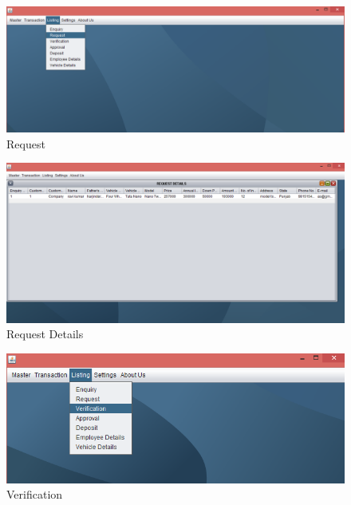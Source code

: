 \begin{figure}[ht]
\begin{center}
\includegraphics[scale=0.5]{images/image34.png}
\end{center}
\caption{Request}
\label{Request }
\end{figure}


\begin{figure}[ht]
\begin{center}
\includegraphics[scale=0.5]{images/image35.png}
\end{center}
\caption{Request Details}
\label{Request Details}
\end{figure}


\begin{figure}[ht]
\begin{center}
\includegraphics[scale=0.5]{images/image36.png}
\end{center}
\caption{Verification}
\label{Verification}
\end{figure}



